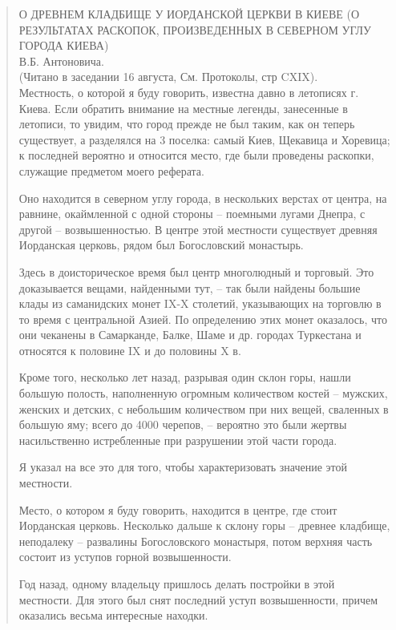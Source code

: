 \begin{quotation}
О ДРЕВНЕМ КЛАДБИЩЕ У ИОРДАНСКОЙ ЦЕРКВИ В КИЕВЕ (О РЕЗУЛЬТАТАХ РАСКОПОК, ПРОИЗВЕДЕННЫХ В СЕВЕРНОМ УГЛУ ГОРОДА КИЕВА)\\

В.Б. Антоновича.\\

(Читано в заседании 16 августа, См. Протоколы, стр CXIX).\\

Местность, о которой я буду говорить, известна давно в летописях г. Киева. Если обратить внимание на местные легенды, занесенные в летописи, то увидим, что город прежде не был таким, как он теперь существует, а разделялся на 3 поселка: самый Киев, Щекавица и Хоревица; к последней вероятно и относится место, где были проведены раскопки, служащие предметом моего реферата.

Оно находится в северном углу города, в нескольких верстах от центра, на равнине, ока\-ймленной с одной стороны – поемными лугами Днепра, с другой – возвышенностью. В центре этой местности существует древняя Иорданская церковь, рядом был Богословский монастырь.

Здесь в доисторическое время был центр многолюдный и торговый. Это доказывается вещами, найденными тут, – так были найдены большие клады из саманидских монет IX-X столетий, указывающих на торговлю в то время с центральной Азией. По определению этих монет оказалось, что они чеканены в Самарканде, Балке, Шаме и др. городах Туркестана и относятся к половине IX и до половины X в. 

Кроме того, несколько лет назад, разрывая один склон горы, нашли большую полость, наполненную огромным количеством костей – мужских, женских и детских, с небольшим количеством при них вещей, сваленных в большую яму; всего до 4000 черепов, – вероятно это были жертвы насильственно истребленные при разрушении этой части города.

Я указал на все это для того, чтобы характеризовать значение этой местности.

Место, о котором я буду говорить, находится в центре, где стоит Иорданская церковь. Несколько дальше к склону горы – древнее кладбище, неподалеку – развалины Богословского монастыря, потом верхняя часть состоит из уступов горной возвышенности.

Год назад, одному владельцу пришлось делать постройки в этой местности. Для этого был снят последний уступ возвышенности, причем оказались весьма интересные находки.


\end{quotation}

